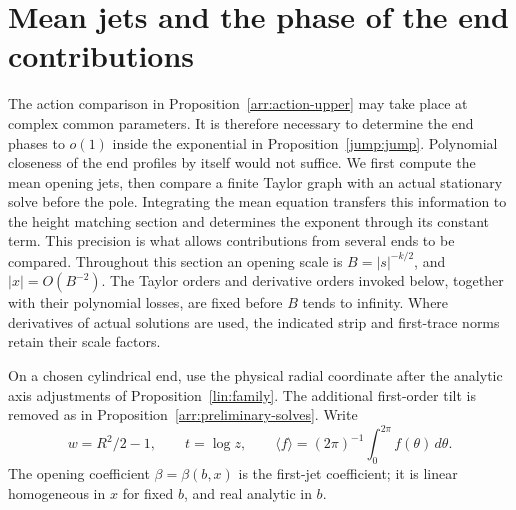 \section{Mean jets and the phase of the end contributions}\label{sec:phase}
The action comparison in Proposition~\ref{arr:action-upper} may take place
at complex common parameters.  It is therefore necessary to determine the
end phases to $o(1)$ inside the exponential in Proposition~\ref{jump:jump}.
Polynomial closeness of the end profiles by itself would not suffice.
We first compute the mean opening jets, then compare a finite Taylor
graph with an actual stationary solve before the pole.  Integrating the
mean equation transfers this information to the height matching section
and determines the exponent through its constant term.  This precision
is what allows contributions from several ends to be compared.
Throughout this section an opening scale is $B=|s|^{-k/2}$, and
$|x|=O(B^{-2})$.  The Taylor orders and derivative orders invoked below,
together with their polynomial losses, are fixed before $B$ tends to
infinity.  Where derivatives of actual solutions are used, the indicated
strip and first-trace norms retain their scale factors.

On a chosen cylindrical end, use the physical radial coordinate after
the analytic axis adjustments of Proposition~\ref{lin:family}.  The
additional first-order tilt is removed as in
Proposition~\ref{arr:preliminary-solves}.  Write
\begin{equation}
 w=R^2/2-1,\qquad t=\log z,\qquad
 \langle f\rangle=(2\pi)^{-1}\int_0^{2\pi}f(\theta)\,d\theta.
 \label{phase:w}
\end{equation}
The opening coefficient $\beta=\beta(b,x)$ is the first-jet coefficient;
it is linear homogeneous in $x$ for fixed $b$, and real analytic in $b$.

